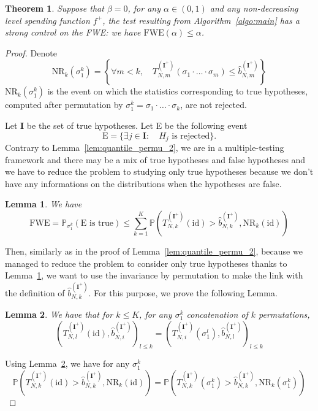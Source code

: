 \documentclass{article}
\theoremstyle{plain}
\newtheorem{Theorem}{Theorem}
\newtheorem{Lemma}{Lemma}
\theoremstyle{remark}
\renewcommand{\P}{\mathbb{P}}
\newcommand{\1}{\mathbbm{1}}
\newcommand{\id}{\mathrm{id}}
\numberwithin{equation}{section}
\begin{document}
\begin{Theorem}\label{th:multi_FWE}
Suppose that $\beta = 0$, for any $\alpha \in (0,1)$ and any non-decreasing level spending function $f^+$, the test resulting from Algorithm~\ref{algo:main} has a strong control on the FWE: we have $\mathrm{FWE}(\alpha)\le\alpha$.
\end{Theorem}
\begin{proof}
Denote 
$$\mathrm{NR}_k(\sigma_1^k) = \left\{\forall m < k,\quad  T_{N,m}^{(\textbf{I}^+)}(\sigma_1\cdot\ldots\cdot\sigma_m) \le   \widehat{b}_{N,m}^{(\textbf{I}^+)}\right\}$$
$\mathrm{NR}_k(\sigma_1^k)$ is the event on which the statistics corresponding to true hypotheses, computed after permutation by $\sigma_1^k=\sigma_1\cdot \ldots \cdot \sigma_k$, are not rejected.


Let $\textbf{I}$ be the set of true hypotheses. Let E be the following event
$$\mathrm{E}= \{ \exists j \in \textbf{I}: \quad H_j \text{ is rejected}\}.$$
Contrary to Lemma~\ref{lem:quantile_permu_2}, we are in a multiple-testing framework and there may be a mix of true hypotheses and false hypotheses and we have to reduce the problem to studying only true hypotheses because we don't have any informations on the distributions when the hypotheses are false.
\begin{Lemma}\label{lem:multiple_test_FWE}
We have 
$$\mathrm{FWE} = \P_{\sigma_1^k}\left(\text{E is true} \right) \le \sum_{k=1}^K\P\left( T_{N,k}^{(\textbf{I}^+)}(\id) > \widehat{b}_{N,k}^{(\textbf{I}^+)}, \mathrm{NR}_k(\id)\right)  $$
\end{Lemma}
Then, similarly as in the proof of Lemma~\ref{lem:quantile_permu_2}, because we managed to reduce the problem to consider only true hypotheses thanks to Lemma~\ref{lem:multiple_test_FWE}, we want to use the invariance by permutation to make the link with the definition of $\widehat{b}_{N,k}^{(\textbf{I}^+)}$. For this purpose, we prove the following Lemma.


\begin{Lemma}\label{lem:invariance}
We have that for $k \le K$, for any ${\sigma_1^k}$ concatenation of $k$ permutations, 
$$(T_{N,l}^{(\textbf{I}^+)}(\id),\widehat{b}_{N,i}^{(\textbf{I}^+)})_{l\le k}=(T_{N,i}^{(\textbf{I}^+)}(\sigma_1^l), \widehat{b}_{N,l}^{(\textbf{I}^+)})_{l\le k}$$
\end{Lemma}
Using Lemma~\ref{lem:invariance}, we have for any ${\sigma_1^k}$
$$\P\left(T_{N,k}^{(\textbf{I}^+)}(\id) > \widehat{b}_{N,k}^{(\textbf{I}^+)}, \mathrm{NR}_k(\id ) \right) = \P\left(T_{N,k}^{(\textbf{I}^+)}({\sigma_1^k}) > \widehat{b}_{N,k}^{(\textbf{I}^+)}, \mathrm{NR}_k({\sigma_1^k}) \right)$$


\end{proof}
\end{document}

